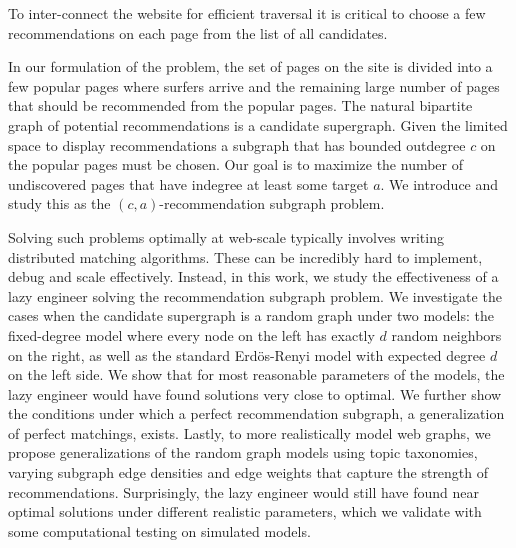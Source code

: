 To inter-connect the website for efficient
traversal it is critical to choose a few recommendations on each
page from the list of all candidates.

In our formulation of the problem, the set of pages on the site is
divided into a few popular pages where surfers arrive and the
remaining large number of pages that should be recommended from the
popular pages. The natural bipartite graph of potential
recommendations is a candidate supergraph. Given the limited space to
display recommendations a subgraph that has bounded outdegree $c$ on the
popular pages must be chosen. Our goal is to maximize the number of
undiscovered pages that have indegree at least some target $a$. We introduce and study this
as the $(c, a)$-recommendation subgraph problem.

Solving such problems optimally at web-scale typically involves
writing distributed matching algorithms.  These can be incredibly hard
to implement, debug and scale effectively.  Instead, in this work, we
study the effectiveness of a lazy engineer solving the recommendation
subgraph problem. We investigate the cases when the candidate
supergraph is a random graph under two models: the fixed-degree model
where every node on the left has exactly $d$ random neighbors on the
right, as well as the standard Erd\"{o}s-Renyi model with expected
degree $d$ on the left side. We show that for most reasonable
parameters of the models, the lazy engineer would have found solutions
very close to optimal. We further show the conditions under which a
perfect recommendation subgraph, a generalization of perfect
matchings, exists. Lastly, to more realistically model web graphs, we
propose generalizations of the random graph models using topic
taxonomies, varying subgraph edge densities and edge weights that
capture the strength of recommendations. Surprisingly, the lazy
engineer would still have found near optimal solutions under different
realistic parameters, which we validate with some computational
testing on simulated models.
\fi 